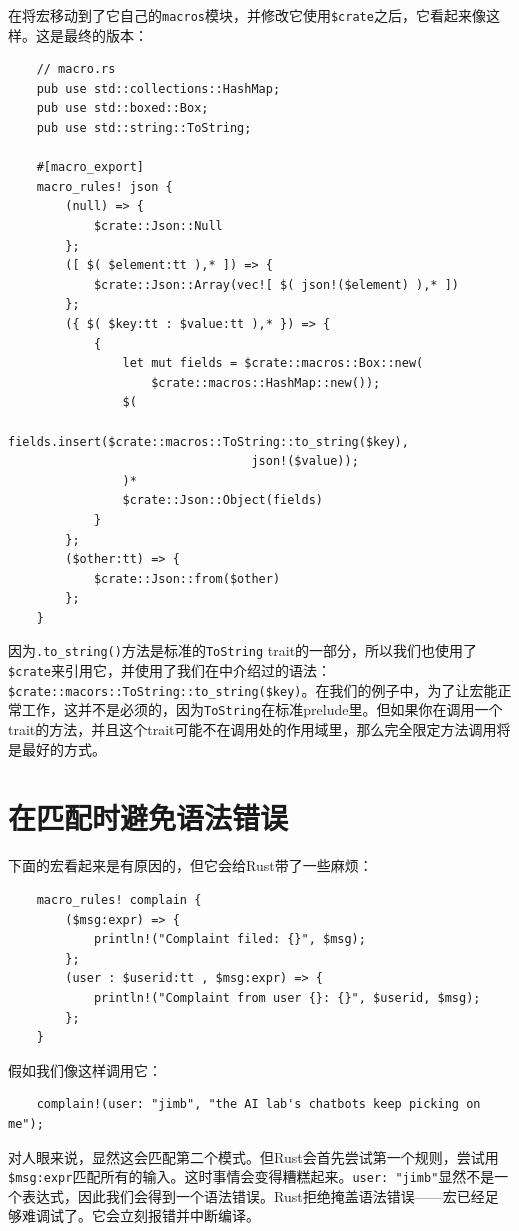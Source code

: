 在将宏移动到了它自己的\texttt{macros}模块，并修改它使用\texttt{\$crate}之后，它看起来像这样。这是最终的版本：
\begin{verbatim}
    // macro.rs
    pub use std::collections::HashMap;
    pub use std::boxed::Box;
    pub use std::string::ToString;

    #[macro_export]
    macro_rules! json {
        (null) => {
            $crate::Json::Null
        };
        ([ $( $element:tt ),* ]) => {
            $crate::Json::Array(vec![ $( json!($element) ),* ])
        };
        ({ $( $key:tt : $value:tt ),* }) => {
            {
                let mut fields = $crate::macros::Box::new(
                    $crate::macros::HashMap::new());
                $(
                    fields.insert($crate::macros::ToString::to_string($key), 
                                  json!($value));
                )*
                $crate::Json::Object(fields)
            }
        };
        ($other:tt) => {
            $crate::Json::from($other)
        };
    }
\end{verbatim}

因为\texttt{.to\_string()}方法是标准的\texttt{ToString} trait的一部分，所以我们也使用了\texttt{\$crate}来引用它，并使用了我们在中介绍过的语法：\texttt{\$crate::macors::ToString::to\_string(\$key)}。在我们的例子中，为了让宏能正常工作，这并不是必须的，因为\texttt{ToString}在标准prelude里。但如果你在调用一个trait的方法，并且这个trait可能不在调用处的作用域里，那么完全限定方法调用将是最好的方式。

\section{在匹配时避免语法错误}
下面的宏看起来是有原因的，但它会给Rust带了一些麻烦：
\begin{verbatim}
    macro_rules! complain {
        ($msg:expr) => {
            println!("Complaint filed: {}", $msg);
        };
        (user : $userid:tt , $msg:expr) => {
            println!("Complaint from user {}: {}", $userid, $msg);
        };
    }
\end{verbatim}

假如我们像这样调用它：
\begin{verbatim}
    complain!(user: "jimb", "the AI lab's chatbots keep picking on me");
\end{verbatim}

对人眼来说，显然这会匹配第二个模式。但Rust会首先尝试第一个规则，尝试用\texttt{\$msg:expr}匹配所有的输入。这时事情会变得糟糕起来。\texttt{user: "jimb"}显然不是一个表达式，因此我们会得到一个语法错误。Rust拒绝掩盖语法错误——宏已经足够难调试了。它会立刻报错并中断编译。

